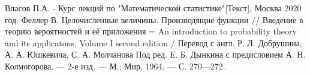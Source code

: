 \newpage
{}

\begin{thebibliography}{}
      Власов П.А.  -  Курс лекций по "Математической статистике"[Текст], Москва 2020 год.
      Феллер В. Целочисленные величины. Производящие функции // Введение в теорию вероятностей и её приложения = An introduction to probability theory and its applicatons, Volume I second edition / Перевод с англ. Р. Л. Добрушина, А. А. Юшкевича, С. А. Молчанова Под ред. Е. Б. Дынкина с предисловием А. Н. Колмогорова. — 2-е изд. — М.: Мир, 1964. — С. 270—272.
\end{thebibliography}
